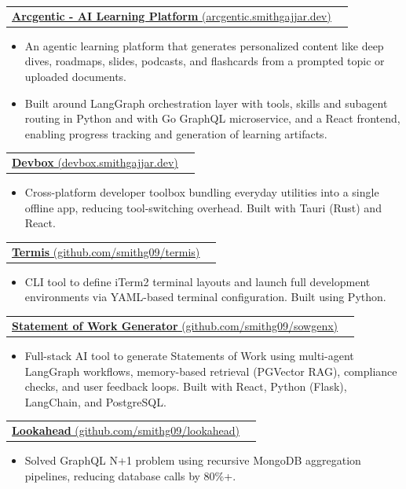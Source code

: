 \documentclass[letterpaper,11pt]{article}
\makeatletter
\newcommand{\resumeItem}[1]{
  \item\small{
    {#1 \vspace{.8pt}}
  }
}
\newcommand{\resumeProjectHeading}[2]{
    \item
    \begin{tabular*}{1.001\textwidth}{l@{\extracolsep{\fill}}r}
      \large#1 & \textbf{\small #2}\\
    \end{tabular*}\vspace{-5pt}
}
\newcommand{\resumeItemListStart}{\begin{itemize}}
\newcommand{\resumeItemListEnd}{\end{itemize}\vspace{-5pt}}
\makeatother
\begin{document}
\resumeProjectHeading
    {\href{https://arcgentic.smithgajjar.dev}{{\underline{\normalsize{\textbf{Arcgentic - AI Learning Platform} (arcgentic.smithgajjar.dev) {\raisebox{-0.1\height}\faExternalLink }}}}}}{}
    \resumeItemListStart
            \resumeItem{\normalsize{An agentic learning platform that generates personalized content like deep dives, roadmaps, slides, podcasts, and flashcards from a prompted topic or uploaded documents.}}
            \resumeItem{\normalsize{Built around LangGraph orchestration layer with tools, skills and subagent routing in Python and with Go GraphQL microservice, and a React frontend, enabling progress tracking and generation of learning artifacts.}}
    \resumeItemListEnd 
    \vspace{-12pt}

\resumeProjectHeading
    {\href{https://devbox.smithgajjar.dev}{{\underline{\normalsize{\textbf{Devbox} (devbox.smithgajjar.dev)  {\raisebox{-0.1\height}\faExternalLink }}}}}}{}
    \resumeItemListStart
            \resumeItem{\normalsize{Cross-platform developer toolbox bundling everyday utilities into a single offline app, reducing tool-switching overhead. Built with Tauri (Rust) and React.}}
    \resumeItemListEnd 
    \vspace{-12pt}

    \resumeProjectHeading
          {\href{https://github.com/smithg09/termis}{{\underline{\normalsize{\textbf{Termis} (github.com/smithg09/termis) {\raisebox{-0.1\height}\faExternalLink }}}}}}{}
          \resumeItemListStart
            \resumeItem{\normalsize{CLI tool to define iTerm2 terminal layouts and launch full development environments via YAML-based terminal configuration. Built using Python.}}
          \resumeItemListEnd
            \vspace{-12pt}

    \resumeProjectHeading
    {\href{https://github.com/smithg09/sowgenx}{{\underline{\normalsize{\textbf{Statement of Work Generator} (github.com/smithg09/sowgenx) {\raisebox{-0.1\height}\faExternalLink }}}}}}{}
    \resumeItemListStart
            \resumeItem{\normalsize{Full-stack AI tool to generate Statements of Work using multi-agent LangGraph workflows, memory-based retrieval (PGVector RAG), compliance checks, and user feedback loops. Built with React, Python (Flask), LangChain, and PostgreSQL.}}
    \resumeItemListEnd
    \vspace{-12pt}

    \resumeProjectHeading
    {\href{https://github.com/smithg09/lookahead}{{\underline{\normalsize{\textbf{Lookahead} (github.com/smithg09/lookahead) {\raisebox{-0.1\height}\faExternalLink }}}}}}{}
    \resumeItemListStart
            \resumeItem{\normalsize{Solved GraphQL N+1 problem using recursive MongoDB aggregation pipelines, reducing database calls by 80\%+.}}
            \resumeItemListEnd
          \vspace{8pt}
\end{document}
